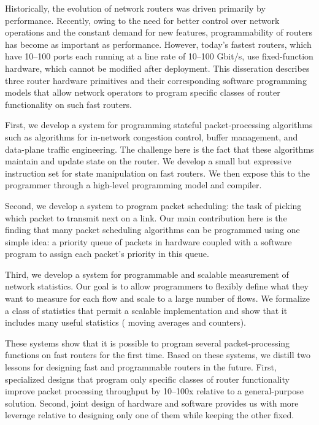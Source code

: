 % 
% 
%
Historically, the evolution of network routers was driven primarily by
performance. Recently, owing to the need for better control over network
operations and the constant demand for new features, programmability of routers
has become as important as performance.  However, today's fastest routers,
which have 10--100 ports each running at a line rate of 10--100 Gbit/s, use
fixed-function hardware, which cannot be modified after deployment. This
disseration describes three router hardware primitives and their
corresponding software programming models that allow network operators to
program specific classes of router functionality on such fast routers.

First, we develop a system for programming stateful packet-processing
algorithms such as algorithms for in-network congestion control, buffer
management, and data-plane traffic engineering. The challenge here is the fact
that these algorithms maintain and update state on the router.  We develop a
small but expressive instruction set for state manipulation on fast routers.
 We then expose this to the programmer through a high-level programming model
and compiler.

Second, we develop a system to program packet scheduling: the task of picking
which packet to transmit next on a link. Our main contribution here is the
finding that many packet scheduling algorithms can be programmed using one
simple idea: a priority queue of packets in hardware coupled with a software
program to assign each packet's priority in this queue.

Third, we develop a system for programmable and scalable measurement of network
statistics. Our goal is to allow programmers to flexibly define what they want
to measure for each flow and scale to a large number of flows. We formalize
a class of statistics that permit a scalable
implementation and show that it includes many useful statistics (\eg
moving averages and counters).

These systems show that it is possible to program several packet-processing
functions on fast routers for the first time. Based on these systems, we
distill two lessons for designing fast and programmable routers in the future.
First, specialized designs that program only specific classes of router
functionality improve packet processing throughput by 10--100x relative to a general-purpose
solution. Second, joint design of
hardware and software provides us with more leverage relative to designing only
one of them while keeping the other fixed.


